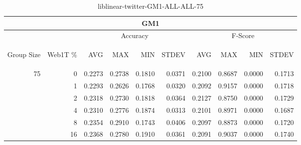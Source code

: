 \begin{center}
\begin{table}[htbp]
\begin{tabular}{ | r | r | r | r | r | r | r | r | r | r |}
\hline
\multicolumn{10}{|c|}{GM1}\\
\hline
 & & \multicolumn{4}{|c|}{Accuracy} & \multicolumn{4}{|c|}{F-Score}\\ \cline{3-10}
\begin{sideways}Group Size\end{sideways} & \begin{sideways}Web1T \%\end{sideways} & \begin{sideways}AVG\end{sideways} & \begin{sideways}MAX\end{sideways} & \begin{sideways}MIN\end{sideways} & \begin{sideways}STDEV\end{sideways} & \begin{sideways}AVG\end{sideways} & \begin{sideways}MAX\end{sideways} & \begin{sideways}MIN\end{sideways} & \begin{sideways}STDEV\end{sideways}\\
\hline
\multirow{5}{*}{75}
 & 0 & 0.2273 & 0.2738 & 0.1810 & 0.0371 & 0.2100 & 0.8687 & 0.0000 & 0.1713\\ \cline{2-10}
 & 1 & 0.2293 & 0.2626 & 0.1768 & 0.0320 & 0.2092 & 0.9157 & 0.0000 & 0.1718\\ \cline{2-10}
 & 2 & 0.2318 & 0.2730 & 0.1818 & 0.0364 & 0.2127 & 0.8750 & 0.0000 & 0.1729\\ \cline{2-10}
 & 4 & 0.2310 & 0.2776 & 0.1874 & 0.0313 & 0.2101 & 0.8971 & 0.0000 & 0.1687\\ \cline{2-10}
 & 8 & 0.2354 & 0.2910 & 0.1743 & 0.0406 & 0.2097 & 0.8873 & 0.0000 & 0.1720\\ \cline{2-10}
 & 16 & 0.2368 & 0.2780 & 0.1910 & 0.0361 & 0.2091 & 0.9037 & 0.0000 & 0.1740\\ \cline{2-10}
\hline
\end{tabular}
\caption{liblinear-twitter-GM1-ALL-ALL-75}
\label{table:liblinear-twitter-GM1-ALL-ALL-75}
\end{table}
\end{center}

